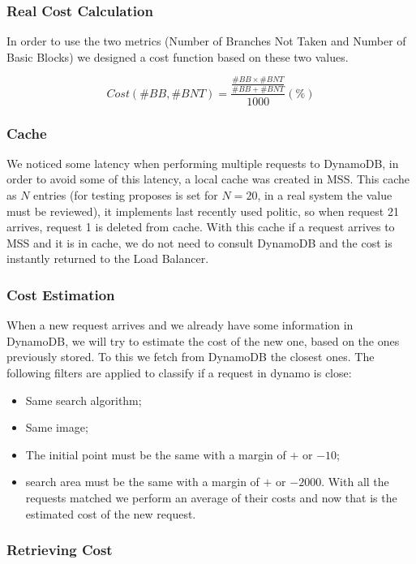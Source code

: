 \documentclass[times, 10pt,twocolumn]{article}
\begin{document}
\subsubsection{Real Cost Calculation}
   In order to use the two metrics (Number of Branches Not Taken and Number of Basic Blocks) we designed a cost function
   based on these two values.

   $$ Cost(\#BB, \#BNT) = \frac{\frac{\#BB \times \#BNT}{\#BB + \#BNT}}{1000} (\%)$$


\subsubsection{Cache}
   We noticed some latency when performing multiple requests to DynamoDB, in order to
   avoid some of this latency, a local cache was created in MSS. This cache as $N$ entries (for 
   testing proposes is set for $N = 20$, in a real system the value must be reviewed), it implements 
   last recently used politic, so when request 21 arrives, request 1 is deleted from cache. With this cache
   if a request arrives to MSS and it is in cache, we do not need to consult DynamoDB and the cost is instantly returned
   to the Load Balancer. 

\subsubsection{Cost Estimation}
   When a new request arrives and we already have some information in DynamoDB, we will try to estimate the cost of the 
   new one, based on the ones previously stored. To this we fetch from DynamoDB the closest ones. The following filters 
   are applied to classify if a request in dynamo is close:
	\begin{itemize}
	\item Same search algorithm;
	\item Same image;
	\item The initial point must be the same with a margin of $+$ or $- 10$;
	\item search area must be the same with a margin of $+$ or $- 2000$.
   With all the requests matched we perform an average of their costs and now that is the estimated cost of the new 
   request.
\end{itemize}

\subsubsection{Retrieving Cost}
\end{document}

